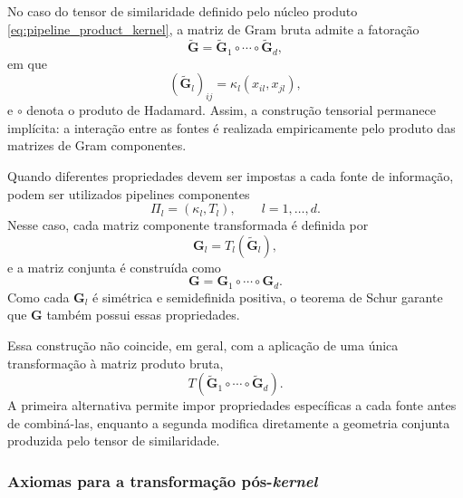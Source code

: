 No caso do tensor de similaridade definido pelo núcleo produto \eqref{eq:pipeline_product_kernel}, a matriz de Gram bruta admite a fatoração
\begin{equation}\label{eq:raw_tensor_gram}
    \widetilde{\mathbf{G}} = \widetilde{\mathbf{G}}_1 \circ \cdots \circ \widetilde{\mathbf{G}}_d,
\end{equation}
em que
\begin{equation}\label{eq:component_raw_gram}
    (\widetilde{\mathbf{G}}_l)_{ij} = \kappa_l(x_{il},x_{jl}),
\end{equation}
e $\circ$ denota o produto de Hadamard. Assim, a construção tensorial permanece implícita: a interação entre as fontes é realizada empiricamente pelo produto das matrizes de Gram componentes.

\begin{remark}
\label{rem:component_transformations}
Quando diferentes propriedades devem ser impostas a cada fonte de informação, podem ser utilizados pipelines componentes
\begin{equation}
    \Pi_l = (\kappa_l,T_l), \qquad l=1,\dots,d.
\end{equation}
Nesse caso, cada matriz componente transformada é definida por
\begin{equation}\label{eq:component_transformed_gram}
    \mathbf{G}_l = T_l(\widetilde{\mathbf{G}}_l),
\end{equation}
e a matriz conjunta é construída como
\begin{equation}\label{eq:transformed_tensor_gram}
    \mathbf{G} = \mathbf{G}_1 \circ \cdots \circ \mathbf{G}_d.
\end{equation}
Como cada $\mathbf{G}_l$ é simétrica e semidefinida positiva, o teorema de Schur garante que $\mathbf{G}$ também possui essas propriedades.

Essa construção não coincide, em geral, com a aplicação de uma única transformação à matriz produto bruta,
\begin{equation}
    T\left(
        \widetilde{\mathbf{G}}_1
        \circ
        \cdots
        \circ
        \widetilde{\mathbf{G}}_d
    \right).
\end{equation}
A primeira alternativa permite impor propriedades específicas a cada fonte antes de combiná-las, enquanto a segunda modifica diretamente a geometria conjunta produzida pelo tensor de similaridade.
\end{remark}

\subsubsection*{Axiomas para a transformação pós-\textit{kernel}}

